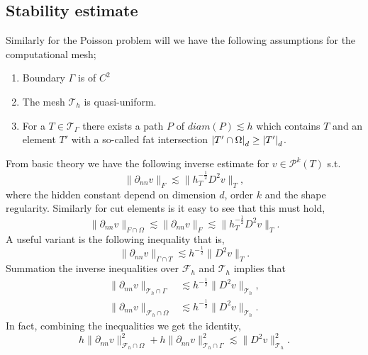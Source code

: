 \subsection{Stability estimate}%
\label{sub:stability_estimate}

Similarly for the Poisson problem will we have the following assumptions for the computational mesh;

\begin{enumerate}[label=\textbf{S.\arabic*}]
    \item\label{as:s1} Boundary $\Gamma $ is of $C^2$
    \item\label{as:s2} The mesh $\mathcal{T} _{h}$ is quasi-uniform.
    \item \label{as:s3}For a $T \in \mathcal{T} _{\Gamma }$ there exists a path $P$ of $diam(P) \lesssim h$ which contains $T$ and an element $T'$ with a so-called fat intersection $
    \left\lvert  T' \cap \Omega   \right\rvert _{d} \ge \left\lvert  T'  \right\rvert _{d}$.
\end{enumerate}

From basic theory we have the following inverse estimate for $ v \in \mathcal{P}^{k}( T)$ s.t. \[
     \| \partial _{nn}  v \|_{F   }^{ }  \lesssim  \| h_{T}^{-\frac{1}{2}} D ^2 v \|_{ T }^{  },
\]
where the hidden constant depend on dimension $d$, order $k$ and the shape regularity. Similarly for cut elements is it easy to see that this must hold,
\begin{equation*}
     \| \partial _{nn}  v \|_{F \cap \Omega    }^{  }  \lesssim\| \partial _{nn}  v \|_{F }^{  }  \lesssim   \| h_{T}^{-\frac{1}{2}} D ^2 v \|_{ T }^{  }.
\end{equation*}
A useful variant is the following inequality that is,
\begin{equation*}
\| \partial _{nn} v \|_{ \Gamma \cap T  }^{  } \lesssim h^{-\frac{1}{2}} \| D^2 v \|_{ T }^{  }.
\end{equation*}
Summation the inverse inequalities over $\mathcal{F}_{h} $ and $\mathcal{T}_{h} $ implies that
\begin{align}
\label{eq:bi_cut_inverse_1}
\| \partial _{nn} v \|_{ \mathcal{T} _{h} \cap \Gamma  }^{  } &\lesssim h^{-\frac{1}{2}} \| D^2 v \|_{ \mathcal{T}_h }^{  }, \\
\label{eq:bi_cut_inverse_2}
\| \partial _{nn}  v \|_{ \mathcal{F}_h \cap \Omega    }^{  }  &  \lesssim   h^{-\frac{1}{2}} \| D^2 v \|_{ \mathcal{T}_h  }^{  }.
\end{align}
In fact, combining the inequalities we get the identity,
\begin{equation}
\label{eq:bi_identity}
h\| \partial _{nn}  v \|_{ \mathcal{F}_h \cap \Omega    }^{2 } + h\| \partial _{nn} v \|_{ \mathcal{T} _{h} \cap \Gamma  }^{2  } \lesssim \| D^2 v \|_{ \mathcal{T} _{h}  }^{2  }.
\end{equation}

